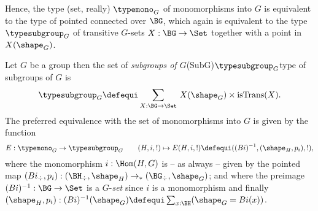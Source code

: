 Hence, the type (set, really) $\typemono_G$ of monomorphisms into $G$ is equivalent to the type of pointed connected \coverings over $\BG$, which again is equivalent to the type $\typesubgroup_G$ of transitive $G$-sets $X:\BG\to\Set$ together with a point in $X(\shape_G)$.

\begin{definition}
  Let $G$ be a group then the set of \emph{subgroups of $G$}\glossary(SubG){$\protect{\typesubgroup_G}$}{type of subgroups of $G$} is
  $$\typesubgroup_G\defequi\sum_{X:\BG\to\Set}{\,}X(\shape_G)\times\mathrm{isTrans}(X).$$
  The preferred equivalence
  with the set of monomorphisms into $G$ is given by the function
 $$E:\typemono_G\to\typesubgroup_G\qquad (H,i,!)\mapsto E(H,i,!)\defequi ((Bi)^{-1},(\shape_H,p_i),!),$$
  where the monomorphism $i:\Hom(H,G)$ is -- as always -- given by the pointed map $(Bi_\div,p_i):(\BH_\div,\shape_H)\to_*(\BG_\div,\shape_G)$; and where the preimage $(Bi)^{-1}:\BG\to\Set$ is a $G$-\emph{set} since $i$ is a monomorphism  and finally $(\shape_H,p_i):(Bi)^{-1}(\shape_G)\defequi \sum_{x:\BH}(\shape_G=Bi(x))$.
\end{definition}

